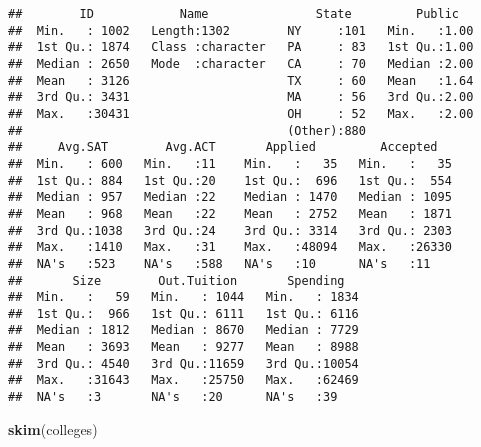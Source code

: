 \documentclass[]{article}
\newenvironment{Shaded}{\begin{snugshade}}{\end{snugshade}}
\newcommand{\KeywordTok}[1]{\textcolor[rgb]{0.13,0.29,0.53}{\textbf{#1}}}
\newcommand{\NormalTok}[1]{#1}
\begin{document}
\begin{verbatim}
##        ID            Name               State         Public    
##  Min.   : 1002   Length:1302        NY     :101   Min.   :1.00  
##  1st Qu.: 1874   Class :character   PA     : 83   1st Qu.:1.00  
##  Median : 2650   Mode  :character   CA     : 70   Median :2.00  
##  Mean   : 3126                      TX     : 60   Mean   :1.64  
##  3rd Qu.: 3431                      MA     : 56   3rd Qu.:2.00  
##  Max.   :30431                      OH     : 52   Max.   :2.00  
##                                     (Other):880                 
##     Avg.SAT        Avg.ACT       Applied         Accepted    
##  Min.   : 600   Min.   :11    Min.   :   35   Min.   :   35  
##  1st Qu.: 884   1st Qu.:20    1st Qu.:  696   1st Qu.:  554  
##  Median : 957   Median :22    Median : 1470   Median : 1095  
##  Mean   : 968   Mean   :22    Mean   : 2752   Mean   : 1871  
##  3rd Qu.:1038   3rd Qu.:24    3rd Qu.: 3314   3rd Qu.: 2303  
##  Max.   :1410   Max.   :31    Max.   :48094   Max.   :26330  
##  NA's   :523    NA's   :588   NA's   :10      NA's   :11     
##       Size        Out.Tuition       Spending    
##  Min.   :   59   Min.   : 1044   Min.   : 1834  
##  1st Qu.:  966   1st Qu.: 6111   1st Qu.: 6116  
##  Median : 1812   Median : 8670   Median : 7729  
##  Mean   : 3693   Mean   : 9277   Mean   : 8988  
##  3rd Qu.: 4540   3rd Qu.:11659   3rd Qu.:10054  
##  Max.   :31643   Max.   :25750   Max.   :62469  
##  NA's   :3       NA's   :20      NA's   :39
\end{verbatim}

\begin{Shaded}
\begin{Highlighting}[]
\KeywordTok{skim}\NormalTok{(colleges)}
\end{Highlighting}
\end{Shaded}
\end{document}
